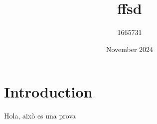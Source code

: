 \documentclass{article}
\title{ffsd}
\author{1665731 }
\date{November 2024}
\begin{document}
\maketitle

\section{Introduction}

Hola, això es una prova
\end{document}
